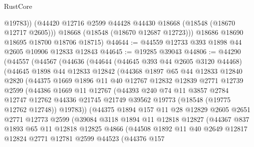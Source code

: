 \begin{lexlean}{RustCore}
\begin{coremodule}
            @19783))
        (@44420 @12716 @2599 @44428 @44430 @18668 (@18548 (@18670 @12717 @2605)))
        @18668
        (@18548 (@18670 @12687 @12723)))
      @18686
      @18690
      @18695
      @18700
      @18706
      @18715)
@44644 := @44559 @12733 @393 @1898 @44 @2605 @10906 @12833 @12843
@44645 := @19285 @39043
@44806 := @44290
    (@44557
      (@44567
        (@44636
          (@44644
            (@44645 @393 @44 @2605 @3120 @44468)
            (@44645
              @1898
              @44
              @12833
              @12842
              (@44368
                @1897
                @65
                @44
                @12833
                @12840
                @2820
                (@44375
                  @1669
                  @1896
                  @11
                  @40
                  @12767
                  @12832
                  @12839
                  @2771
                  @12739
                  @2599
                  (@44386
                    @1669
                    @11
                    @12767
                    (@44393
                      @240
                      @74
                      @11
                      @3857
                      @2784
                      @12747
                      @12762
                      @44336
                      @21745
                      @21749
                      @39562
                      @19773
                      (@18548 (@19775 @12762 @12748))
                      @19783))
                  (@44375
                    @1894
                    @157
                    @11
                    @28
                    @12829
                    @2605
                    @2651
                    @2771
                    @12773
                    @2599
                    (@39084
                      @3118
                      @1894
                      @11
                      @12818
                      @12827
                      (@44367
                        @837
                        @1893
                        @65
                        @11
                        @12818
                        @12825
                        @4866
                        (@44508
                          @1892
                          @11
                          @40
                          @2649
                          @12817
                          @12824
                          @2771
                          @12781
                          @2599
                          @44523
                          (@44376
                            @157

\end{coremodule}
\end{lexlean}
